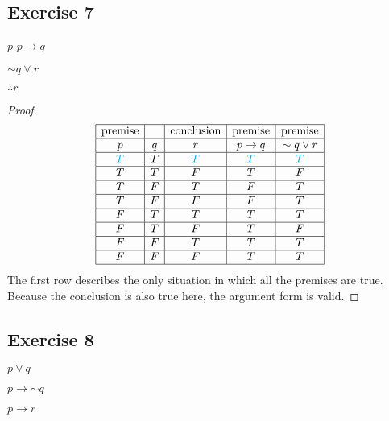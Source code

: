 \documentclass[14pt]{extarticle}
\begin{document}
\subsection{Exercise 7} $p$
$p \to q$

${\sim q} \vee r$

$\therefore r$

\begin{proof}
    $$
        \begin{array}{|c|c|c|c|c|}
            \hline
            \text{premise} &   & \text{conclusion} & \text{premise} & \text{premise}  \\
            \hline
            p              & q & r                 & p \to q        & {\sim q} \vee r \\
            \hline
            \color{cyan} T & T & \color{cyan} T    & \color{cyan} T & \color{cyan} T  \\
            \hline
            T              & T & F                 & T              & F               \\
            \hline
            T              & F & T                 & F              & T               \\
            \hline
            T              & F & F                 & F              & T               \\
            \hline
            F              & T & T                 & T              & T               \\
            \hline
            F              & T & F                 & T              & F               \\
            \hline
            F              & F & T                 & T              & T               \\
            \hline
            F              & F & F                 & T              & T               \\
            \hline
        \end{array}
    $$
    The first row describes the only situation in which all the premises are true. Because the conclusion is also true here, the argument form is valid.
\end{proof}

\subsection{Exercise 8}
$p \vee q$

$p \to {\sim q}$

$p \to r$
\end{document}
